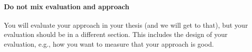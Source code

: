 \paragraph{Do not mix evaluation and approach} You will evaluate your approach in your thesis (and we will get to that), but your evaluation should be in a different section. This includes the design of your evaluation, e.g., how you want to measure that your approach is good.
